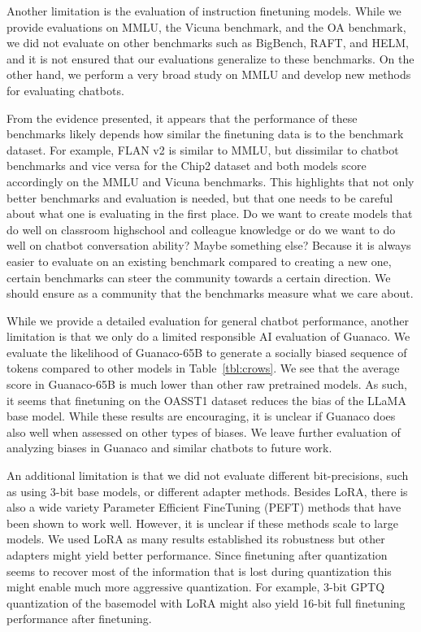 Another limitation is the evaluation of instruction finetuning models. While we provide evaluations on MMLU, the Vicuna benchmark, and the OA benchmark, we did not evaluate on other benchmarks such as BigBench, RAFT, and HELM, and it is not ensured that our evaluations generalize to these benchmarks. On the other hand, we perform a very broad study on MMLU and develop new methods for evaluating chatbots.

From the evidence presented, it appears that the performance of these benchmarks likely depends how similar the finetuning data is to the benchmark dataset. For example, FLAN v2 is similar to MMLU, but dissimilar to chatbot benchmarks and vice versa for the Chip2 dataset and both models score accordingly on the MMLU and Vicuna benchmarks. This highlights that not only better benchmarks and evaluation is needed, but that one needs to be careful about what one is evaluating in the first place. Do we want to create models that do well on classroom highschool and colleague knowledge or do we want to do well on chatbot conversation ability? Maybe something else? Because it is always easier to evaluate on an existing benchmark compared to creating a new one, certain benchmarks can steer the community towards a certain direction. We should ensure as a community that the benchmarks measure what we care about. 

While we provide a detailed evaluation for general chatbot performance, another limitation is that we only do a limited responsible AI evaluation of {Guanaco}. We evaluate the likelihood of {Guanaco}-65B to generate a socially biased sequence of tokens compared to other models in Table~\ref{tbl:crows}. We see that the average score in {Guanaco}-65B is much lower than other raw pretrained models. As such, it seems that finetuning on the OASST1 dataset reduces the bias of the LLaMA base model. While these results are encouraging, it is unclear if {Guanaco} does also well when assessed on other types of biases. We leave further evaluation of analyzing biases in {Guanaco} and similar chatbots to future work.

An additional limitation is that we did not evaluate different bit-precisions, such as using 3-bit base models, or different adapter methods. Besides LoRA, there is also a wide variety Parameter Efficient FineTuning (PEFT) methods that have been shown to work well. However, it is unclear if these methods scale to large models. We used LoRA as many results established its robustness but other adapters might yield better performance. Since finetuning after quantization seems to recover most of the information that is lost during quantization this might enable much more aggressive quantization. For example, 3-bit GPTQ quantization of the basemodel with LoRA might also yield 16-bit full finetuning performance after finetuning.

